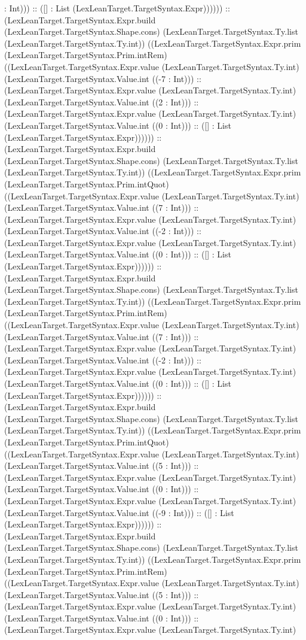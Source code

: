 \documentclass[11pt]{article}
\begin{document}
: Int))) :: ([] : List (LexLeanTarget.TargetSyntax.Expr)))))) :: (LexLeanTarget.TargetSyntax.Expr.build (LexLeanTarget.TargetSyntax.Shape.cons) (LexLeanTarget.TargetSyntax.Ty.list (LexLeanTarget.TargetSyntax.Ty.int)) ((LexLeanTarget.TargetSyntax.Expr.prim (LexLeanTarget.TargetSyntax.Prim.intRem) ((LexLeanTarget.TargetSyntax.Expr.value (LexLeanTarget.TargetSyntax.Ty.int) (LexLeanTarget.TargetSyntax.Value.int ((-7 : Int))) :: (LexLeanTarget.TargetSyntax.Expr.value (LexLeanTarget.TargetSyntax.Ty.int) (LexLeanTarget.TargetSyntax.Value.int ((2 : Int))) :: (LexLeanTarget.TargetSyntax.Expr.value (LexLeanTarget.TargetSyntax.Ty.int) (LexLeanTarget.TargetSyntax.Value.int ((0 : Int))) :: ([] : List (LexLeanTarget.TargetSyntax.Expr)))))) :: (LexLeanTarget.TargetSyntax.Expr.build (LexLeanTarget.TargetSyntax.Shape.cons) (LexLeanTarget.TargetSyntax.Ty.list (LexLeanTarget.TargetSyntax.Ty.int)) ((LexLeanTarget.TargetSyntax.Expr.prim (LexLeanTarget.TargetSyntax.Prim.intQuot) ((LexLeanTarget.TargetSyntax.Expr.value (LexLeanTarget.TargetSyntax.Ty.int) (LexLeanTarget.TargetSyntax.Value.int ((7 : Int))) :: (LexLeanTarget.TargetSyntax.Expr.value (LexLeanTarget.TargetSyntax.Ty.int) (LexLeanTarget.TargetSyntax.Value.int ((-2 : Int))) :: (LexLeanTarget.TargetSyntax.Expr.value (LexLeanTarget.TargetSyntax.Ty.int) (LexLeanTarget.TargetSyntax.Value.int ((0 : Int))) :: ([] : List (LexLeanTarget.TargetSyntax.Expr)))))) :: (LexLeanTarget.TargetSyntax.Expr.build (LexLeanTarget.TargetSyntax.Shape.cons) (LexLeanTarget.TargetSyntax.Ty.list (LexLeanTarget.TargetSyntax.Ty.int)) ((LexLeanTarget.TargetSyntax.Expr.prim (LexLeanTarget.TargetSyntax.Prim.intRem) ((LexLeanTarget.TargetSyntax.Expr.value (LexLeanTarget.TargetSyntax.Ty.int) (LexLeanTarget.TargetSyntax.Value.int ((7 : Int))) :: (LexLeanTarget.TargetSyntax.Expr.value (LexLeanTarget.TargetSyntax.Ty.int) (LexLeanTarget.TargetSyntax.Value.int ((-2 : Int))) :: (LexLeanTarget.TargetSyntax.Expr.value (LexLeanTarget.TargetSyntax.Ty.int) (LexLeanTarget.TargetSyntax.Value.int ((0 : Int))) :: ([] : List (LexLeanTarget.TargetSyntax.Expr)))))) :: (LexLeanTarget.TargetSyntax.Expr.build (LexLeanTarget.TargetSyntax.Shape.cons) (LexLeanTarget.TargetSyntax.Ty.list (LexLeanTarget.TargetSyntax.Ty.int)) ((LexLeanTarget.TargetSyntax.Expr.prim (LexLeanTarget.TargetSyntax.Prim.intQuot) ((LexLeanTarget.TargetSyntax.Expr.value (LexLeanTarget.TargetSyntax.Ty.int) (LexLeanTarget.TargetSyntax.Value.int ((5 : Int))) :: (LexLeanTarget.TargetSyntax.Expr.value (LexLeanTarget.TargetSyntax.Ty.int) (LexLeanTarget.TargetSyntax.Value.int ((0 : Int))) :: (LexLeanTarget.TargetSyntax.Expr.value (LexLeanTarget.TargetSyntax.Ty.int) (LexLeanTarget.TargetSyntax.Value.int ((-9 : Int))) :: ([] : List (LexLeanTarget.TargetSyntax.Expr)))))) :: (LexLeanTarget.TargetSyntax.Expr.build (LexLeanTarget.TargetSyntax.Shape.cons) (LexLeanTarget.TargetSyntax.Ty.list (LexLeanTarget.TargetSyntax.Ty.int)) ((LexLeanTarget.TargetSyntax.Expr.prim (LexLeanTarget.TargetSyntax.Prim.intRem) ((LexLeanTarget.TargetSyntax.Expr.value (LexLeanTarget.TargetSyntax.Ty.int) (LexLeanTarget.TargetSyntax.Value.int ((5 : Int))) :: (LexLeanTarget.TargetSyntax.Expr.value (LexLeanTarget.TargetSyntax.Ty.int) (LexLeanTarget.TargetSyntax.Value.int ((0 : Int))) :: (LexLeanTarget.TargetSyntax.Expr.value (LexLeanTarget.TargetSyntax.Ty.int) 
\end{document}
